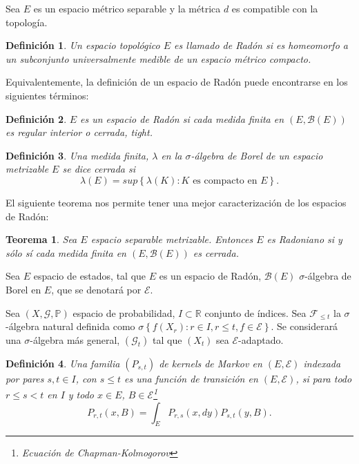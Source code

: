 \documentclass{article}
\newtheorem{Def}{Definición}[section]
\newtheorem{Teo}{Teorema}[section]
\newcommand{\rea}{\mathbb{R}}
\newcommand{\prob}{\mathbb{P}}
\newcommand{\ER}{\left(E,\mathcal{E}\right)}
\numberwithin{equation}{section}
\begin{document}
Sea $E$ es un espacio m\'etrico separable y la m\'etrica $d$ es
compatible con la topolog\'ia.


\begin{Def}
Un espacio topol\'ogico $E$ es llamado de {\em Rad\'on} si es
homeomorfo a un subconjunto universalmente medible de un espacio
m\'etrico compacto.
\end{Def}

Equivalentemente, la definici\'on de un espacio de Rad\'on puede
encontrarse en los siguientes t\'erminos:


\begin{Def}
$E$ es un espacio de Rad\'on si cada medida finita en
$\left(E,\mathcal{B}\left(E\right)\right)$ es regular interior o
cerrada, {\em tight}.
\end{Def}

\begin{Def}
Una medida finita, $\lambda$ en la $\sigma$-\'algebra de Borel de
un espacio metrizable $E$ se dice cerrada si
\begin{equation}\label{Eq.A2.3}
\lambda\left(E\right)=sup\left\{\lambda\left(K\right):K\textrm{ es
compacto en }E\right\}.
\end{equation}
\end{Def}

El siguiente teorema nos permite tener una mejor caracterizaci\'on
de los espacios de Rad\'on:
\begin{Teo}\label{Tma.A2.2}
Sea $E$ espacio separable metrizable. Entonces $E$ es Radoniano si
y s\'olo s\'i cada medida finita en
$\left(E,\mathcal{B}\left(E\right)\right)$ es cerrada.
\end{Teo}

Sea $E$ espacio de estados, tal que $E$ es un espacio de Rad\'on,
$\mathcal{B}\left(E\right)$ $\sigma$-\'algebra de Borel en $E$,
que se denotar\'a por $\mathcal{E}$.

Sea $\left(X,\mathcal{G},\prob\right)$ espacio de probabilidad,
$I\subset\rea$ conjunto de \'indices. Sea $\mathcal{F}_{\leq t}$
la $\sigma$-\'algebra natural definida como
$\sigma\left\{f\left(X_{r}\right):r\in I, r\leq
t,f\in\mathcal{E}\right\}$. Se considerar\'a una
$\sigma$-\'algebra m\'as general, $ \left(\mathcal{G}_{t}\right)$
tal que $\left(X_{t}\right)$ sea $\mathcal{E}$-adaptado.

\begin{Def}
Una familia $\left(P_{s,t}\right)$ de kernels de Markov en
$\left(E,\mathcal{E}\right)$ indexada por pares $s,t\in I$, con
$s\leq t$ es una funci\'on de transici\'on en $\ER$, si  para todo
$r\leq s< t$ en $I$ y todo $x\in E$,
$B\in\mathcal{E}$\footnote{Ecuaci\'on de Chapman-Kolmogorov}
\begin{equation}\label{Eq.Kernels}
P_{r,t}\left(x,B\right)=\int_{E}P_{r,s}\left(x,dy\right)P_{s,t}\left(y,B\right).
\end{equation}
\end{Def}
\end{document}
